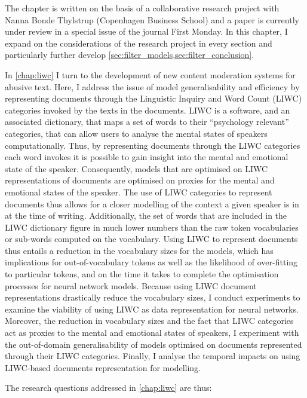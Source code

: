 The chapter is written on the basis of a collaborative research project with Nanna Bonde Thylstrup (Copenhagen Business School) and a paper is currently under review in a special issue of the journal First Monday.
In this chapter, I expand on the considerations of the research project in every section and particularly further develop \cref{sec:filter_models,sec:filter_conclusion}.\vspace{5mm}

In \cref{chap:liwc} I turn to the development of new content moderation systems for abusive text.
Here, I address the issue of model generalisability and efficiency by representing documents through the Linguistic Inquiry and Word Count (LIWC) categories invoked by the texts in the documents.
LIWC is a software, and an associated dictionary, that maps a set of words to their ``psychology relevant'' categories, that can allow users to analyse the mental states of speakers computationally.
Thus, by representing documents through the LIWC categories each word invokes it is possible to gain insight into the mental and emotional state of the speaker.
Consequently, models that are optimised on LIWC representations of documents are optimised on proxies for the mental and emotional states of the speaker.
The use of LIWC categories to represent documents thus allows for a closer modelling of the context a given speaker is in at the time of writing.
Additionally, the set of words that are included in the LIWC dictionary figure in much lower numbers than the raw token vocabularies or sub-words computed on the vocabulary.
Using LIWC to represent documents thus entails a reduction in the vocabulary sizes for the models, which has implications for out-of-vocabulary tokens as well as the likelihood of over-fitting to particular tokens, and on the time it takes to complete the optimisation processes for neural network models.
Because using LIWC document representations drastically reduce the vocabulary sizes, I conduct experiments to examine the viability of using LIWC as data representation for neural networks.
Moreover, the reduction in vocabulary sizes and the fact that LIWC categories act as proxies to the mental and emotional states of speakers, I experiment with the out-of-domain generalisability of models optimised on documents represented through their LIWC categories.
Finally, I analyse the temporal impacts on using LIWC-based documents representation for modelling.

The research questions addressed in \cref{chap:liwc} are thus:

